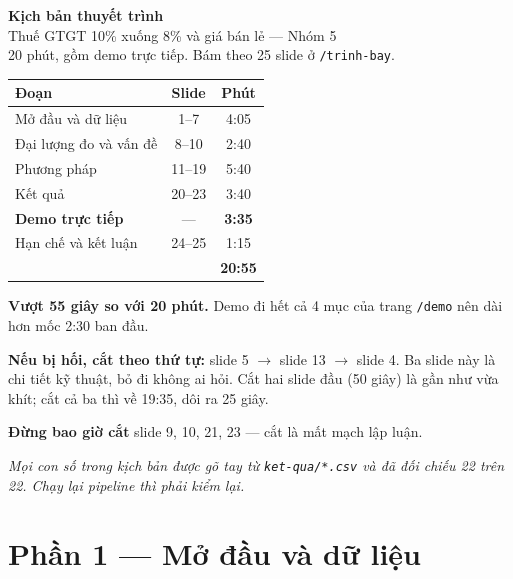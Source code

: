\documentclass[12pt]{article}
\newcommand{\chidan}[1]{{\color{xam}\small\emph{#1}}\par}
\begin{document}
\begin{center}
  {\LARGE\bfseries Kịch bản thuyết trình}\\[4pt]
  {\large Thuế GTGT 10\% xuống 8\% và giá bán lẻ --- Nhóm 5}\\[6pt]
  {\color{xam}20 phút, gồm demo trực tiếp. Bám theo 25 slide ở \texttt{/trinh-bay}.}
\end{center}

\vspace{6pt}

\begin{center}
\begin{tabular}{@{}lcc@{}}
\toprule
\textbf{Đoạn} & \textbf{Slide} & \textbf{Phút} \\
\midrule
Mở đầu và dữ liệu        & 1--7   & 4:05 \\
Đại lượng đo và vấn đề   & 8--10  & 2:40 \\
Phương pháp              & 11--19 & 5:40 \\
Kết quả                  & 20--23 & 3:40 \\
\textbf{Demo trực tiếp}  & ---    & \textbf{3:35} \\
Hạn chế và kết luận      & 24--25 & 1:15 \\
\midrule
& & \textbf{20:55} \\
\bottomrule
\end{tabular}
\end{center}

\vspace{4pt}

\textbf{Vượt 55 giây so với 20 phút.} Demo đi hết cả 4 mục của trang \texttt{/demo}
nên dài hơn mốc 2:30 ban đầu.

\textbf{Nếu bị hối, cắt theo thứ tự:} slide 5 $\to$ slide 13 $\to$ slide 4. Ba slide
này là chi tiết kỹ thuật, bỏ đi không ai hỏi. Cắt hai slide đầu (50 giây) là gần như
vừa khít; cắt cả ba thì về 19:35, dôi ra 25 giây.

\textbf{Đừng bao giờ cắt} slide 9, 10, 21, 23 --- cắt là mất mạch lập luận.

\vspace{4pt}

\chidan{Mọi con số trong kịch bản được gõ tay từ \texttt{ket-qua/*.csv} và đã đối
chiếu 22 trên 22. Chạy lại pipeline thì phải kiểm lại.}

\section*{Phần 1 --- Mở đầu và dữ liệu}
\end{document}
